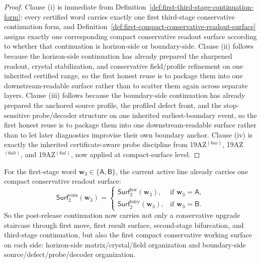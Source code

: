 \begin{proof}
Clause (i) is immediate from Definition~\ref{def:first-third-stage-continuation-form}: every certified word carries exactly one first third-stage conservative continuation form, and Definition~\ref{def:first-compact-conservative-readout-surface} assigns exactly one corresponding compact conservative readout surface according to whether that continuation is horizon-side or boundary-side. Clause (ii) follows because the horizon-side continuation has already prepared the sharpened readout, crystal stabilization, and conservative field/profile refinement on one inherited certified range, so the first honest reuse is to package them into one downstream-readable surface rather than to scatter them again across separate layers. Clause (iii) follows because the boundary-side continuation has already prepared the anchored source profile, the profiled defect front, and the stop-sensitive probe/decoder structure on one inherited earliest-boundary event, so the first honest reuse is to package them into one downstream-readable surface rather than to let later diagnostics improvise their own boundary anchor. Clause (iv) is exactly the inherited certificate-aware probe discipline from 19AZ$^{(6ai)}$, 19AZ$^{(6ak)}$, and 19AZ$^{(6al)}$, now applied at compact-surface level.
\end{proof}

\begin{corollary}
\label{cor:present-post-v3290-line-already-carries-a-first-compact-conservative-readout-surface}
For the first-stage word \(\mathbf w_3\in\{\mathsf A,\mathsf B\}\), the current active line already carries one compact conservative readout surface:
\[
 \mathsf{Surf}^{\mathrm{cons}}_{2}(\mathbf w_3)
 =
 \begin{cases}
 \mathsf{Surf}^{\mathrm{hor}}_{2}(\mathbf w_3), & \text{if }\mathbf w_3=\mathsf A,\\[2mm]
 \mathsf{Surf}^{\mathrm{bdry}}_{2}(\mathbf w_3), & \text{if }\mathbf w_3=\mathsf B.
 \end{cases}
\]
So the post-release continuation now carries not only a conservative upgrade staircase through first move, first result surface, second-stage bifurcation, and third-stage continuation, but also the first compact conservative working surface on each side: horizon-side matrix/crystal/field organization and boundary-side source/defect/probe/decoder organization.
\end{corollary}

